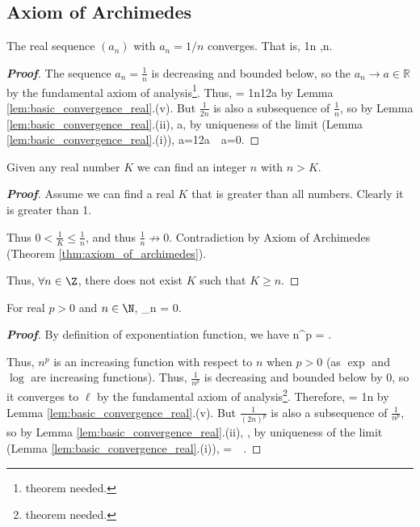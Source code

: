 \subsection{Axiom of Archimedes}

\begin{theorem}\label{thm:axiom_of_archimedes}
The real sequence $(a_n)$ with $a_n = 1/n$ converges. That is,
\be
\frac 1n ,\quad {}n\to \infty.
\ee
\end{theorem}

\begin{proof}[{\bf Proof}]
The sequence $a_n=\frac 1n$ is decreasing and bounded below, so the $a_n\to a\in\mathbb{R}$ by the fundamental axiom of analysis\footnote{theorem needed.}. Thus,%
\be
{}= \frac1n\to \frac 12a
\ee
by Lemma \ref{lem:basic_convergence_real}.(v). But $\frac{1}{2n}$ is also a subsequence of $\frac 1n$, so by Lemma \ref{lem:basic_convergence_real}.(ii),
\be
{}\to a,
\ee
by uniqueness of the limit (Lemma \ref{lem:basic_convergence_real}.(i)),
\be
a=\frac 12a\ \ra \ a=0.
\ee
\end{proof}

\begin{corollary}
Given any real number $K$ we can find an integer $n$ with $n>K$.
\end{corollary}

\begin{proof}[\bf Proof]
Assume we can find a real $K$ that is greater than all numbers. Clearly it is greater than 1.

Thus $0 < \frac{1}{K} \leq \frac{1}{n}$, and thus $\frac{1}{n} \not\to 0$. Contradiction by Axiom of Archimedes (Theorem \ref{thm:axiom_of_archimedes}).

Thus, $\forall n \in \Z$, there does not exist $K$ such that $K \geq n$.
\end{proof}

\begin{proposition}
For real $p>0$ and $n\in \N$,
\be
\lim_{n\to \infty}  = 0.
\ee
\end{proposition}

\begin{proof}[\bf Proof]
By definition of exponentiation function, we have
\be
n^p = \exp{}.
\ee

Thus, $n^p$ is an increasing function with respect to $n$ when $p>0$ (as $\exp$ and $\log$ are increasing functions). Thus, $\frac 1{n^p}$ is decreasing and bounded below by 0, so it converges to $\ell$ by the fundamental axiom of analysis\footnote{theorem needed.}. Therefore,
\be
{}= \frac1n \to {}\ell
\ee
by Lemma \ref{lem:basic_convergence_real}.(v). But $\frac{1}{(2n)^p}$ is also a subsequence of $\frac 1{n^p}$, so by Lemma \ref{lem:basic_convergence_real}.(ii),
\be
{}\to \ell,
\ee
by uniqueness of the limit (Lemma \ref{lem:basic_convergence_real}.(i)),
\be
\ell=\ell \ \ra \ .
\ee%
\end{proof}

